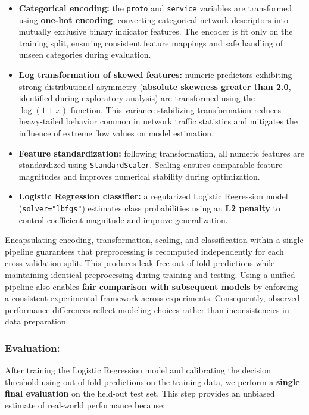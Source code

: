 \documentclass[
  letterpaper,
  DIV=11,
  numbers=noendperiod]{scrartcl}
\begin{document}
\begin{itemize}
\item
  \textbf{Categorical encoding:} the \texttt{proto} and \texttt{service}
  variables are transformed using \textbf{one-hot encoding}, converting
  categorical network descriptors into mutually exclusive binary
  indicator features. The encoder is fit only on the training split,
  ensuring consistent feature mappings and safe handling of unseen
  categories during evaluation.
\item
  \textbf{Log transformation of skewed features:} numeric predictors
  exhibiting strong distributional asymmetry (\textbf{absolute skewness
  greater than 2.0}, identified during exploratory analysis) are
  transformed using the \(\log(1+x)\) function. This
  variance-stabilizing transformation reduces heavy-tailed behavior
  common in network traffic statistics and mitigates the influence of
  extreme flow values on model estimation.
\item
  \textbf{Feature standardization:} following transformation, all
  numeric features are standardized using \texttt{StandardScaler}.
  Scaling ensures comparable feature magnitudes and improves numerical
  stability during optimization.
\item
  \textbf{Logistic Regression classifier:} a regularized Logistic
  Regression model (\texttt{solver="lbfgs"}) estimates class
  probabilities using an \textbf{L2 penalty} to control coefficient
  magnitude and improve generalization.
\end{itemize}

Encapsulating encoding, transformation, scaling, and classification
within a single pipeline guarantees that preprocessing is recomputed
independently for each cross-validation split. This produces leak-free
out-of-fold predictions while maintaining identical preprocessing during
training and testing. Using a unified pipeline also enables \textbf{fair
comparison with subsequent models} by enforcing a consistent
experimental framework across experiments. Consequently, observed
performance differences reflect modeling choices rather than
inconsistencies in data preparation.

\subsubsection{Evaluation:}\label{evaluation}

After training the Logistic Regression model and calibrating the
decision threshold using out-of-fold predictions on the training data,
we perform a \textbf{single final evaluation} on the held-out test set.
This step provides an unbiased estimate of real-world performance
because:
\end{document}
